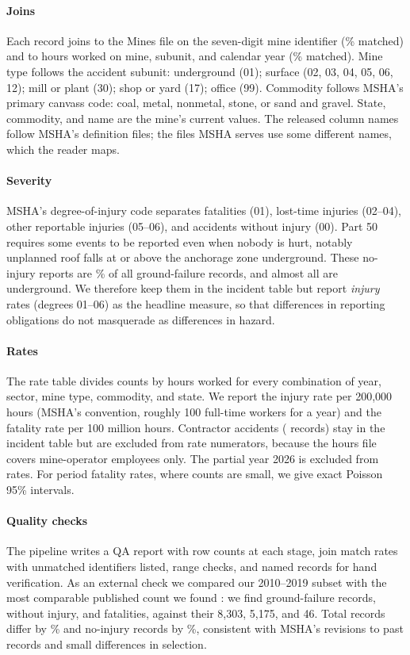 \documentclass[letterpaper,twocolumn,10pt]{article}
\begin{document}
\paragraph{Joins} Each record joins to the Mines file on the seven-digit mine identifier (\MineMatchPct\% matched) and to hours worked on mine, subunit, and calendar year (\HoursMatchPct\% matched). Mine type follows the accident subunit: underground (01); surface (02, 03, 04, 05, 06, 12); mill or plant (30); shop or yard (17); office (99). Commodity follows MSHA's primary canvass code: coal, metal, nonmetal, stone, or sand and gravel. State, commodity, and name are the mine's current values. The released column names follow MSHA's definition files; the files MSHA serves use some different names, which the reader maps.

\paragraph{Severity} MSHA's degree-of-injury code separates fatalities (01), lost-time injuries (02--04), other reportable injuries (05--06), and accidents without injury (00). Part 50 requires some events to be reported even when nobody is hurt, notably unplanned roof falls at or above the anchorage zone underground. These no-injury reports are \PctGFNoInjury\% of all ground-failure records, and almost all are underground. We therefore keep them in the incident table but report \emph{injury} rates (degrees 01--06) as the headline measure, so that differences in reporting obligations do not masquerade as differences in hazard.

\paragraph{Rates} The rate table divides counts by hours worked for every combination of year, sector, mine type, commodity, and state. We report the injury rate per 200,000 hours (MSHA's convention, roughly 100 full-time workers for a year) and the fatality rate per 100 million hours. Contractor accidents (\NGFContractor{} records) stay in the incident table but are excluded from rate numerators, because the hours file covers mine-operator employees only. The partial year 2026 is excluded from rates. For period fatality rates, where counts are small, we give exact Poisson 95\% intervals.

\paragraph{Quality checks} The pipeline writes a QA report with row counts at each stage, join match rates with unmatched identifiers listed, range checks, and named records for hand verification. As an external check we compared our 2010--2019 subset with the most comparable published count we found \citep{Khademian2022}: we find \KhN{} ground-failure records, \KhNoInj{} without injury, and \KhFatal{} fatalities, against their 8,303, 5,175, and 46. Total records differ by \KhDiffPct\% and no-injury records by \KhNoInjDiffPct\%, consistent with MSHA's revisions to past records and small differences in selection.
\end{document}
